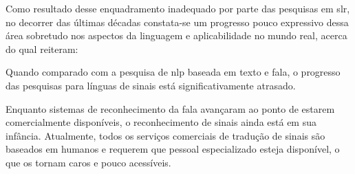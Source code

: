 


Como resultado desse enquadramento inadequado por parte das pesquisas em \acrshort{slr}, no decorrer das últimas décadas constata-se um progresso pouco expressivo dessa área sobretudo nos aspectos da linguagem e aplicabilidade no mundo real, acerca do qual  reiteram:


\begin{citacao}
    Quando comparado com a pesquisa de \acrlong{nlp} baseada em texto e fala, o progresso das pesquisas para línguas de sinais está significativamente atrasado. \cite[tradução nossa]{selvaraj-2022-openhands,yin-2021-sl-in-nlp}
\end{citacao}

\begin{citacao}
    Enquanto sistemas de reconhecimento da fala avançaram ao ponto de estarem comercialmente disponíveis, o reconhecimento de sinais ainda está em sua infância.
    Atualmente, todos os serviços comerciais de tradução de sinais são baseados em humanos e requerem que pessoal especializado esteja disponível, o que os tornam caros e pouco acessíveis. \cite[tradução nossa]{cooper-2011-slr}
\end{citacao}


